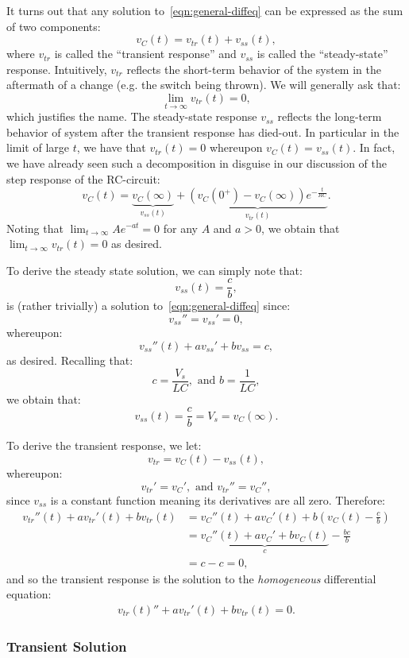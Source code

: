 \documentclass[twoside]{article}
\begin{document}
It turns out that any solution to~\ref{eqn:general-diffeq} can be expressed as the sum of two components:
\[
    v_{C}(t) = v_{tr}(t) + v_{ss}(t),
\]
where $v_{tr}$ is called the ``transient response'' and $v_{ss}$ is called the ``steady-state'' response. Intuitively, $v_{tr}$ reflects the short-term behavior of the system in the aftermath of a change (e.g. the switch being thrown). We will generally ask that:
\[
    \lim_{t \to \infty} v_{tr}(t) = 0,
\]
which justifies the name. The steady-state response $v_{ss}$ reflects the long-term behavior of system after the transient response has died-out. In particular in the limit of large $t$, we have that $v_{tr}(t) = 0$ whereupon $v_{C}(t) = v_{ss}(t)$. In fact, we have already seen such a decomposition in disguise in our discussion of the step response of the RC-circuit:
\[
    v_{C}(t) = \underbrace{v_{C}(\infty)}_{v_{ss}(t)} + \underbrace{\left(v_{C}(0^{+}) - v_{C}(\infty)\right)e^{-\frac{t}{RC}}}_{v_{tr}(t)}.
\]
Noting that $\lim_{t\to\infty}Ae^{-at} = 0$ for any $A$ and $a > 0$, we obtain that $\lim_{t\to\infty} v_{tr}(t) = 0$ as desired. 

To derive the steady state solution, we can simply note that:
\[
    v_{ss}(t) = \frac{c}{b},
\]
is (rather trivially) a solution to~\ref{eqn:general-diffeq} since:
\[
    v_{ss}'' = v_{ss}' = 0,
\]
whereupon:
\[
    v_{ss}''(t) + av_{ss}' + b v_{ss} = c,
\]
as desired. Recalling that:
\[
    c = \frac{V_{s}}{LC}, \text{ and } b = \frac{1}{LC},
\]
we obtain that:
\[
    v_{ss}(t) = \frac{c}{b} = V_{s} = v_{C}(\infty).
\]

To derive the transient response, we let:
\[
    v_{tr} = v_{C}(t) - v_{ss}(t),
\]
whereupon:
\[
    v_{tr}' = v_{C}', \text{ and } v_{tr}'' = v_{C}'',
\]
since $v_{ss}$ is a constant function meaning its derivatives are all zero. Therefore:
\begin{align*}
    v_{tr}''(t) + a v_{tr}'(t) + b v_{tr}(t) &= v_{C}''(t) + av_{C}'(t) + b\left(v_{C}(t) - \frac{c}{b}\right) \\
    &= \underbrace{v_{C}''(t) + a v_{C}' + b v_{C}(t)}_{c} - \frac{bc}{b} \\
    &= c - c = 0,
\end{align*}
and so the transient response is the solution to the \emph{homogeneous} differential equation:
\begin{gather}
    \label{eqn:transient-response}
    v_{tr}(t)'' + a v_{tr}'(t) + bv_{tr}(t) = 0.
\end{gather}

\subsubsection{Transient Solution}
\end{document}
